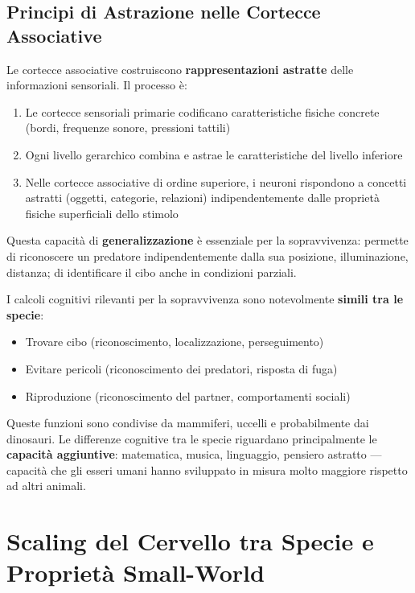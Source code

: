 \subsection{Principi di Astrazione nelle Cortecce Associative}

Le cortecce associative costruiscono \textbf{rappresentazioni astratte} delle informazioni sensoriali. Il processo è:

\begin{enumerate}
    \item Le cortecce sensoriali primarie codificano caratteristiche fisiche concrete (bordi, frequenze sonore, pressioni tattili)
    \item Ogni livello gerarchico combina e astrae le caratteristiche del livello inferiore
    \item Nelle cortecce associative di ordine superiore, i neuroni rispondono a concetti astratti (oggetti, categorie, relazioni) indipendentemente dalle proprietà fisiche superficiali dello stimolo
\end{enumerate}

Questa capacità di \textbf{generalizzazione} è essenziale per la sopravvivenza: permette di riconoscere un predatore indipendentemente dalla sua posizione, illuminazione, distanza; di identificare il cibo anche in condizioni parziali.



I calcoli cognitivi rilevanti per la sopravvivenza sono notevolmente \textbf{simili tra le specie}:

\begin{itemize}
    \item Trovare cibo (riconoscimento, localizzazione, perseguimento)
    \item Evitare pericoli (riconoscimento dei predatori, risposta di fuga)
    \item Riproduzione (riconoscimento del partner, comportamenti sociali)
\end{itemize}

Queste funzioni sono condivise da mammiferi, uccelli e probabilmente dai dinosauri. Le differenze cognitive tra le specie riguardano principalmente le \textbf{capacità aggiuntive}: matematica, musica, linguaggio, pensiero astratto — capacità che gli esseri umani hanno sviluppato in misura molto maggiore rispetto ad altri animali.



\section{Scaling del Cervello tra Specie e Proprietà Small-World}



